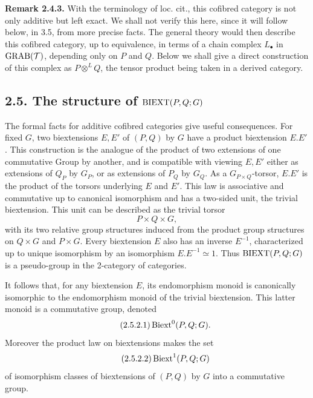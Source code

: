 \documentclass[11pt]{article}
\begin{document}
\textbf{Remark 2.4.3.}  With the terminology of loc. cit., this cofibred category is not only additive but left exact.  We shall not verify this here, since it will follow below, in 3.5, from more precise facts.  The general theory would then describe this cofibred category, up to equivalence, in terms of a chain complex \(L_\bullet\) in \(\operatorname{GRAB}(\mathcal T)\), depending only on \(P\) and \(Q\).  Below we shall give a direct construction of this complex as \(P\otimes^L Q\), the tensor product being taken in a derived category.

\subsection*{2.5. The structure of \(\operatorname{BIEXT}(P,Q;G)\)}
The formal facts for additive cofibred categories give useful consequences.  For fixed \(G\), two biextensions \(E,E'\) of \((P,Q)\) by \(G\) have a product biextension \(E.E'\).  This construction is the analogue of the product of two extensions of one commutative Group by another, and is compatible with viewing \(E,E'\) either as extensions of \(Q_P\) by \(G_P\), or as extensions of \(P_Q\) by \(G_Q\).  As a \(G_{P\times Q}\)-torsor, \(E.E'\) is the product of the torsors underlying \(E\) and \(E'\).  This law is associative and commutative up to canonical isomorphism and has a two-sided unit, the trivial biextension.  This unit can be described as the trivial torsor
\begin{equation}\tag{2.5.1.1}
  P\times Q\times G,
\end{equation}
with its two relative group structures induced from the product group structures on \(Q\times G\) and \(P\times G\).  Every biextension \(E\) also has an inverse \(E^{-1}\), characterized up to unique isomorphism by an isomorphism \(E.E^{-1}\simeq1\).  Thus \(\operatorname{BIEXT}(P,Q;G)\) is a pseudo-group in the 2-category of categories.

It follows that, for any biextension \(E\), its endomorphism monoid is canonically isomorphic to the endomorphism monoid of the trivial biextension.  This latter monoid is a commutative group, denoted
\begin{equation}\tag{2.5.2.1}
  \operatorname{Biext}^0(P,Q;G).
\end{equation}
Moreover the product law on biextensions makes the set
\begin{equation}\tag{2.5.2.2}
  \operatorname{Biext}^1(P,Q;G)
\end{equation}
of isomorphism classes of biextensions of \((P,Q)\) by \(G\) into a commutative group.
\end{document}
